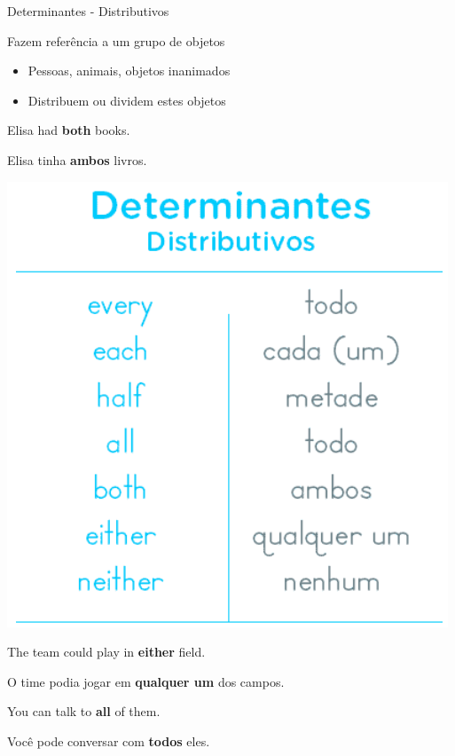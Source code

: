 \documentclass[compress,mathserif,xcolor=table]{beamer}
\begin{document}

\begin{frame}{Determinantes - Distributivos}

\begin{minipage}{.54\textwidth}
Fazem referência a um grupo de objetos
\begin{itemize}
    \item Pessoas, animais, objetos inanimados
    \item Distribuem ou dividem estes objetos
\end{itemize}

\vspace{0.5cm}

Elisa had \textbf{both} books.

Elisa tinha \textbf{ambos} livros.

\end{minipage}
\begin{minipage}{.44\textwidth}
\includegraphics[width=\linewidth]{images/determinantes_distributivos.png}
\end{minipage}

\vspace{0.25cm}

The team could play in \textbf{either} field.

O time podia jogar em \textbf{qualquer um} dos campos.

\vspace{0.2cm}

You can talk to \textbf{all} of them.

Você pode conversar com \textbf{todos} eles.

\end{frame}
\end{document}
